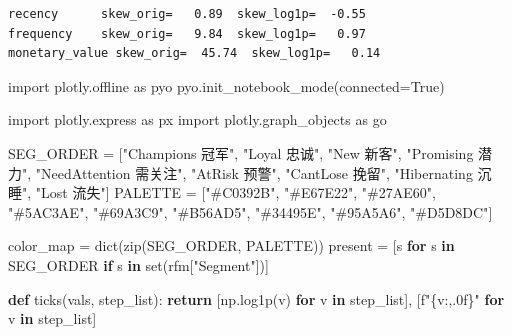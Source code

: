\documentclass[
]{ctexart}
\newenvironment{Shaded}{\begin{snugshade}}{\end{snugshade}}
\newcommand{\BuiltInTok}[1]{\textcolor[rgb]{0.00,0.23,0.31}{#1}}
\newcommand{\ControlFlowTok}[1]{\textcolor[rgb]{0.00,0.23,0.31}{\textbf{#1}}}
\newcommand{\ImportTok}[1]{\textcolor[rgb]{0.00,0.46,0.62}{#1}}
\newcommand{\KeywordTok}[1]{\textcolor[rgb]{0.00,0.23,0.31}{\textbf{#1}}}
\newcommand{\NormalTok}[1]{\textcolor[rgb]{0.00,0.23,0.31}{#1}}
\newcommand{\OperatorTok}[1]{\textcolor[rgb]{0.37,0.37,0.37}{#1}}
\newcommand{\SpecialCharTok}[1]{\textcolor[rgb]{0.37,0.37,0.37}{#1}}
\newcommand{\SpecialStringTok}[1]{\textcolor[rgb]{0.13,0.47,0.30}{#1}}
\newcommand{\StringTok}[1]{\textcolor[rgb]{0.13,0.47,0.30}{#1}}
\newcommand{\VariableTok}[1]{\textcolor[rgb]{0.07,0.07,0.07}{#1}}
\begin{document}
\begin{verbatim}
recency      skew_orig=   0.89  skew_log1p=  -0.55
frequency    skew_orig=   9.84  skew_log1p=   0.97
monetary_value skew_orig=  45.74  skew_log1p=   0.14
\end{verbatim}

\begin{Shaded}
\begin{Highlighting}[]
\ImportTok{import}\NormalTok{ plotly.offline }\ImportTok{as}\NormalTok{ pyo}
\NormalTok{pyo.init\_notebook\_mode(connected}\OperatorTok{=}\VariableTok{True}\NormalTok{)}

\ImportTok{import}\NormalTok{ plotly.express }\ImportTok{as}\NormalTok{ px}
\ImportTok{import}\NormalTok{ plotly.graph\_objects }\ImportTok{as}\NormalTok{ go}

\NormalTok{SEG\_ORDER }\OperatorTok{=}\NormalTok{ [}\StringTok{"Champions 冠军"}\NormalTok{, }\StringTok{"Loyal 忠诚"}\NormalTok{, }\StringTok{"New 新客"}\NormalTok{, }\StringTok{"Promising 潜力"}\NormalTok{,}
             \StringTok{"NeedAttention 需关注"}\NormalTok{, }\StringTok{"AtRisk 预警"}\NormalTok{, }\StringTok{"CantLose 挽留"}\NormalTok{,}
             \StringTok{"Hibernating 沉睡"}\NormalTok{, }\StringTok{"Lost 流失"}\NormalTok{]}
\NormalTok{PALETTE }\OperatorTok{=}\NormalTok{ [}\StringTok{"\#C0392B"}\NormalTok{, }\StringTok{"\#E67E22"}\NormalTok{, }\StringTok{"\#27AE60"}\NormalTok{, }\StringTok{"\#5AC3AE"}\NormalTok{, }\StringTok{"\#69A3C9"}\NormalTok{,}
           \StringTok{"\#B56AD5"}\NormalTok{, }\StringTok{"\#34495E"}\NormalTok{, }\StringTok{"\#95A5A6"}\NormalTok{, }\StringTok{"\#D5D8DC"}\NormalTok{]}


\NormalTok{color\_map }\OperatorTok{=} \BuiltInTok{dict}\NormalTok{(}\BuiltInTok{zip}\NormalTok{(SEG\_ORDER, PALETTE))}
\NormalTok{present }\OperatorTok{=}\NormalTok{ [s }\ControlFlowTok{for}\NormalTok{ s }\KeywordTok{in}\NormalTok{ SEG\_ORDER }\ControlFlowTok{if}\NormalTok{ s }\KeywordTok{in} \BuiltInTok{set}\NormalTok{(rfm[}\StringTok{"Segment"}\NormalTok{])]}

\KeywordTok{def}\NormalTok{ ticks(vals, step\_list):}
    \ControlFlowTok{return}\NormalTok{ [np.log1p(v) }\ControlFlowTok{for}\NormalTok{ v }\KeywordTok{in}\NormalTok{ step\_list], [}\SpecialStringTok{f"}\SpecialCharTok{\{}\NormalTok{v}\SpecialCharTok{:,.0f\}}\SpecialStringTok{"} \ControlFlowTok{for}\NormalTok{ v }\KeywordTok{in}\NormalTok{ step\_list]}


\end{Highlighting}
\end{Shaded}
\end{document}
